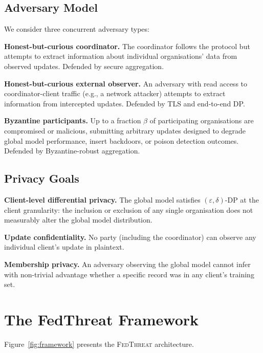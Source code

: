 \documentclass[sigconf,nonacm]{acmart}
\begin{document}
\subsection{Adversary Model}

We consider three concurrent adversary types:

\textbf{Honest-but-curious coordinator.} The coordinator follows the
protocol but attempts to extract information about individual organisations'
data from observed updates. Defended by secure aggregation.

\textbf{Honest-but-curious external observer.} An adversary with read access
to coordinator-client traffic (e.g., a network attacker) attempts to extract
information from intercepted updates. Defended by TLS and end-to-end DP.

\textbf{Byzantine participants.} Up to a fraction $\beta$ of participating
organisations are compromised or malicious, submitting arbitrary updates
designed to degrade global model performance, insert backdoors, or
poison detection outcomes. Defended by Byzantine-robust aggregation.

\subsection{Privacy Goals}

\textbf{Client-level differential privacy.} The global model satisfies
$(\varepsilon, \delta)$-DP at the client granularity: the inclusion or
exclusion of any single organisation does not measurably alter the global
model distribution.

\textbf{Update confidentiality.} No party (including the coordinator) can
observe any individual client's update in plaintext.

\textbf{Membership privacy.} An adversary observing the global model cannot
infer with non-trivial advantage whether a specific record was in any
client's training set.

\section{The FedThreat Framework}

Figure~\ref{fig:framework} presents the \textsc{FedThreat} architecture.
\end{document}
